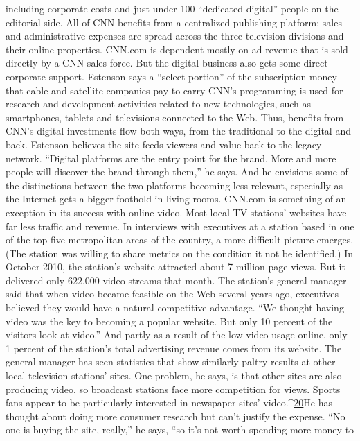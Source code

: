 including corporate costs and just under 100 ``dedicated digital'' people on the
editorial side. All of CNN benefits from a centralized publishing platform; sales
and administrative expenses are spread across the three television divisions and
their online properties.
CNN.com is dependent mostly on ad revenue that is sold directly by a CNN
sales force. But the digital business also gets some direct corporate support. Estenson
says a ``select portion'' of the subscription money that cable and satellite companies
pay to carry CNN's programming is used for research and development
activities related to new technologies, such as smartphones, tablets and televisions
connected to the Web. Thus, benefits from CNN's digital investments flow both
ways, from the traditional to the digital and back.
Estenson believes the site feeds viewers and value back to the legacy network.
``Digital platforms are the entry point for the brand. More and more people will
discover the brand through them,'' he says. And he envisions some of the distinctions
between the two platforms becoming less relevant, especially as the Internet
gets a bigger foothold in living rooms.
CNN.com is something of an exception in its success with online video. Most
local TV stations' websites have far less traffic and revenue. In interviews with executives
at a station based in one of the top five metropolitan areas of the country,
a more difficult picture emerges. (The station was willing to share metrics on the
condition it not be identified.) In October 2010, the station's website attracted
about 7 million page views. But it delivered only 622,000 video streams that
month. The station's general manager said that when video became feasible on
the Web several years ago, executives believed they would have a natural competitive
advantage. ``We thought having video was the key to becoming a popular
website. But only 10 percent of the visitors look at video.'' And partly as a result
of the low video usage online, only 1 percent of the station's total advertising
revenue comes from its website.
The general manager has seen statistics that show similarly paltry results at
other local television stations' sites. One problem, he says, is that other sites are
also producing video, so broadcast stations face more competition for views.
Sports fans appear to be particularly interested in newspaper sites' video.^{\href{#endnotes-chapter-4}{20}}He has
thought about doing more consumer research but can't justify the expense. ``No
one is buying the site, really,'' he says, ``so it's not worth spending more money to
